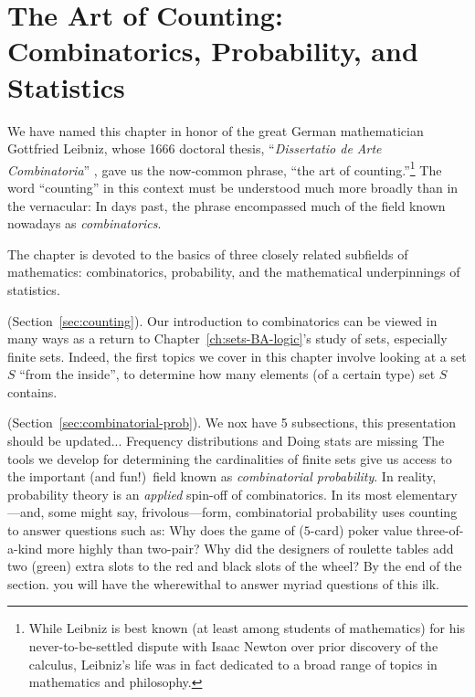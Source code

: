 
\chapter{The Art of Counting:
Combinatorics, Probability, and Statistics}
\label{ch:prob-stat}
\label{ch:combinatorics}

We have named this chapter in honor of the great German mathematician
Gottfried Leibniz,  whose 1666 doctoral thesis, ``{\it Dissertatio de Arte Combinatoria}''
\cite{Leibnitz}, gave us the now-common phrase, ``the art of
counting.''\footnote{While Leibniz is best known (at least among students of mathematics) for his
never-to-be-settled dispute with Isaac Newton over prior discovery of the calculus, Leibniz's life
was in fact dedicated to a broad range of topics in mathematics and philosophy.}
The word ``counting'' in this context must be understood much more broadly than in the 
vernacular: In days past, the phrase encompassed much of the field known nowadays as
{\it combinatorics}. 

The chapter is devoted to the basics of three closely related subfields of mathematics: combinatorics, probability, and the mathematical underpinnings of statistics.

\medskip


 (Section~\ref{sec:counting}).
Our introduction to combinatorics can be viewed in many ways as a return to Chapter~\ref{ch:sets-BA-logic}'s study of sets, especially finite sets.  Indeed, the first topics we cover in this chapter involve looking at a set $S$ ``from the inside'', to determine how many elements (of a certain type) set $S$ contains.

\medskip

 
 
 (Section~\ref{sec:combinatorial-prob}).
{\Denis We nox have 5 subsections, this presentation should be updated... Frequency distributions and Doing stats are missing}
The tools we develop for determining the cardinalities of finite sets
give us access to the important (and fun!)~field known as {\em combinatorial probability}. 
In reality, probability theory is an {\em applied} spin-off of combinatorics.  In its most 
elementary---and, some might say, frivolous---form, combinatorial probability uses counting to 
answer questions such as:  Why does the game of ($5$-card) poker value three-of-a-kind
more highly than two-pair?  Why did the designers of roulette tables add two (green) extra 
slots to the red and black slots of the wheel?  By the end of the section. you will have the 
wherewithal to answer myriad questions of this ilk. 

